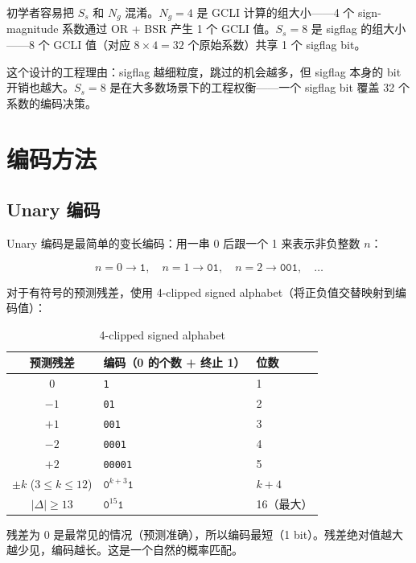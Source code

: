 初学者容易把 $S_s$ 和 $N_g$ 混淆。$N_g = 4$ 是 GCLI 计算的组大小——4 个 sign-magnitude 系数通过 OR + BSR 产生 1 个 GCLI 值。$S_s = 8$ 是 sigflag 的组大小——8 个 GCLI 值（对应 $8 \times 4 = 32$ 个原始系数）共享 1 个 sigflag bit。

这个设计的工程理由：sigflag 越细粒度，跳过的机会越多，但 sigflag 本身的 bit 开销也越大。$S_s = 8$ 是在大多数场景下的工程权衡——一个 sigflag bit 覆盖 32 个系数的编码决策。

\section{编码方法}

\subsection{Unary 编码}

Unary 编码是最简单的变长编码：用一串 0 后跟一个 1 来表示非负整数 $n$：

\begin{equation}
n = 0 \to \texttt{1}, \quad n = 1 \to \texttt{01}, \quad n = 2 \to \texttt{001}, \quad \ldots
\end{equation}

对于有符号的预测残差，使用 4-clipped signed alphabet（将正负值交替映射到编码值）：

\begin{table}[H]
\centering
\caption{4-clipped signed alphabet}
\begin{tabular}{@{}cll@{}}
\toprule
预测残差 & 编码（0 的个数 + 终止 1） & 位数 \\
\midrule
0 & \texttt{1} & 1 \\
$-1$ & \texttt{01} & 2 \\
$+1$ & \texttt{001} & 3 \\
$-2$ & \texttt{0001} & 4 \\
$+2$ & \texttt{00001} & 5 \\
$\pm k$ ($3 \leq k \leq 12$) & $\texttt{0}^{k+3}\texttt{1}$ & $k + 4$ \\
$|\Delta| \geq 13$ & $\texttt{0}^{15}\texttt{1}$ & 16（最大） \\
\bottomrule
\end{tabular}
\end{table}

\begin{engineeringnote}
残差为 0 是最常见的情况（预测准确），所以编码最短（1 bit）。残差绝对值越大越少见，编码越长。这是一个自然的概率匹配。
\end{engineeringnote}

